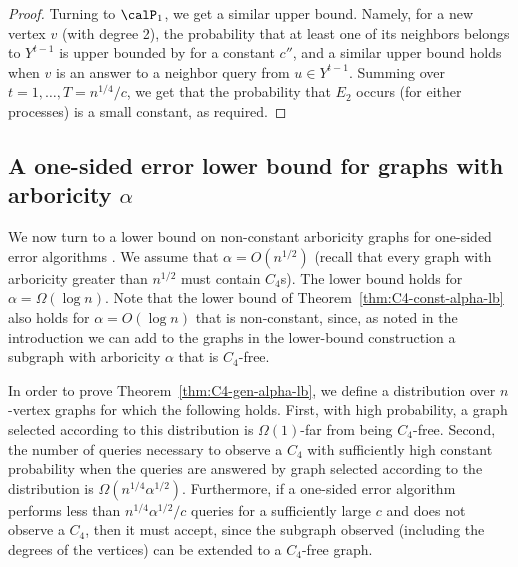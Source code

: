 \begin{proof}
Turning to $\calP_1$, we get a similar upper bound. Namely, for a new vertex $v$ (with degree 2), the probability that at least one of its neighbors belongs to $Y^{t-1}$ is upper bounded by
for a constant $c''$,
 and a similar upper bound holds when $v$ is an answer to a neighbor query from $u\in Y^{t-1}$.
  Summing over $t=1,\dots,T= n^{1/4}/c$, we get that the probability that $E_2$ occurs (for either processes) is a small constant, as required.
\end{proof}

\subsection{A one-sided error lower bound for graphs with arboricity $\alpha$}
We now turn to a lower bound on non-constant arboricity graphs for one-sided error algorithms . We assume that $\alpha =O(n^{1/2})$ (recall that every graph with  arboricity greater than $n^{1/2}$ must contain $C_4$s). %
The lower bound holds for $\alpha = \Omega(\log n)$. Note that the lower bound of Theorem~\ref{thm:C4-const-alpha-lb} also holds for $\alpha = O(\log n)$ that is non-constant, since, as noted in the introduction  we can add to the graphs in the lower-bound construction a subgraph with arboricity $\alpha$ that is $C_4$-free. 

In order to prove Theorem~\ref{thm:C4-gen-alpha-lb}, we define
a distribution %
over $n$-vertex graphs for which the following holds. First, with high probability, a graph selected according to %
this distribution is $\Omega(1)$-far from being $C_4$-free. Second, the number of queries necessary to observe a $C_4$ with sufficiently high constant probability when the queries are answered by graph selected according to
the distribution %
is $\Omega(n^{1/4}\alpha^{1/2})$.
Furthermore, if a one-sided error algorithm performs less than 
$n^{1/4}\alpha^{1/2}/c$ queries for a sufficiently large $c$ and does not observe a $C_4$, then it must accept, since the subgraph observed (including the degrees of the vertices) can be extended to a $C_4$-free graph.

